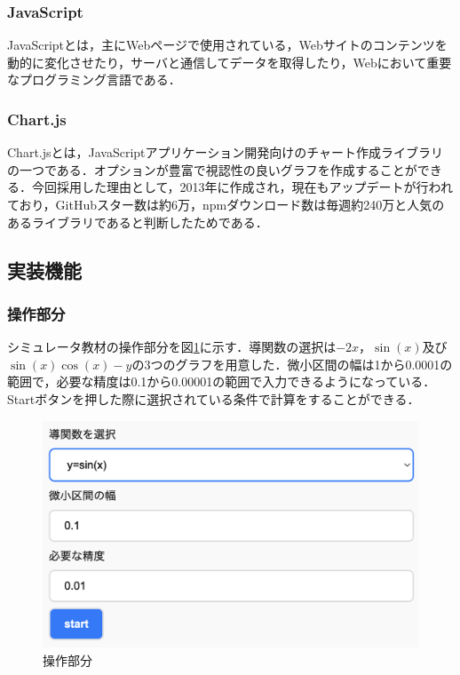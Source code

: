 \documentclass[a4paper, 12pt]{ltjsarticle}
\begin{document}
\subsubsection{JavaScript}
JavaScriptとは，主にWebページで使用されている，Webサイトのコンテンツを動的に変化させたり，サーバと通信してデータを取得したり，Webにおいて重要なプログラミング言語である．
\subsubsection{Chart.js}
Chart.jsとは，JavaScriptアプリケーション開発向けのチャート作成ライブラリの一つである．オプションが豊富で視認性の良いグラフを作成することができる．今回採用した理由として，2013年に作成され，現在もアップデートが行われており，GitHubスター数は約6万，npmダウンロード数は毎週約240万と人気のあるライブラリであると判断したためである．
\clearpage
\subsection{実装機能}
\subsubsection{操作部分}
シミュレータ教材の操作部分を図\ref{fig:操作部分}に示す．導関数の選択は$-2x$，$\sin(x)$及び$\sin(x)\cos(x)-y$の3つのグラフを用意した．微小区間の幅は1から0.0001の範囲で，必要な精度は0.1から0.00001の範囲で入力できるようになっている．Startボタンを押した際に選択されている条件で計算をすることができる．

\begin{figure}[h]
\begin{center}
\includegraphics[clip,width=\textwidth,keepaspectratio]{sim-sousa.png}
\end{center}
\caption{操作部分}
\label{fig:操作部分}
\end{figure}
\end{document}
